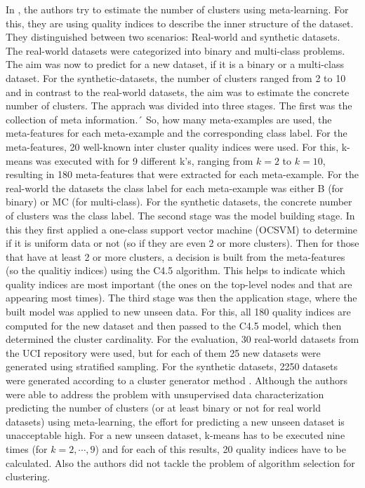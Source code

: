 In \cite{Corchado2019AConformations}, the authors try to estimate the number of clusters using meta-learning.
For this, they are using quality indices to describe the inner structure of the dataset.
They distinguished between two scenarios: Real-world and synthetic datasets.
The real-world datasets were categorized into binary and multi-class problems.
The aim was now to predict for a new dataset, if it is a binary or a multi-class dataset.
For the synthetic-datasets, the number of clusters ranged from 2 to 10 and in contrast to the real-world datasets, the aim was to estimate the concrete number of clusters.
The apprach was divided into three stages.
The first was the collection of meta information.´
So, how many meta-examples are used, the meta-features for each meta-example and the corresponding class label.
For the meta-features, 20 well-known inter cluster quality indices were used. 
For this, k-means was executed with for 9 different k's, ranging from $k=2$ to $k=10$, resulting in 180 meta-features that were extracted for each meta-example.
For the real-world the datasets the class label for each meta-example was either B (for binary) or MC (for multi-class).
For the synthetic datasets, the concrete number of clusters was the class label.
The second stage was the model building stage.
In this they first applied a one-class support vector machine (OCSVM) to determine if it is uniform data or not (so if they are even 2 or more clusters).
Then for those that have at least 2 or more clusters, a decision is built from the meta-features (so the qualitiy indices) using the C4.5 algorithm.
This helps to indicate which quality indices are most important (the ones on the top-level nodes and that are appearing most times).
The third stage was then the application stage, where the built model was applied to new unseen data.
For this, all 180 quality indices are computed for the new dataset and then passed to the C4.5 model, which then determined the cluster cardinality.
For the evaluation, 30 real-world datasets from the UCI repository were used, but for each of them 25 new datasets were generated using stratified sampling.
For the synthetic datasets, 2250 datasets were generated according to a cluster generator method \cite{QiuBrigham2006GenerationSeparation}.
Although the authors were able to address the problem with unsupervised data characterization predicting the number of clusters (or at least binary or not for real world datasets) using meta-learning, the effort for predicting a new unseen dataset is unacceptable high.
For a new unseen dataset, k-means has to be executed nine times (for $k=2, \cdots, 9$) and for each of this results, 20 quality indices have to be calculated. 
Also the authors did not tackle the problem of algorithm selection for clustering.

